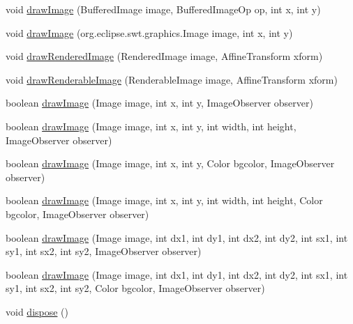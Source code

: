 \begin{DoxyCompactItemize}
\item 
void \mbox{\hyperlink{classorg_1_1jfree_1_1experimental_1_1swt_1_1_s_w_t_graphics2_d_aad9768e6f3ecfa1aabe17824271c56a4}{draw\+Image}} (Buffered\+Image image, Buffered\+Image\+Op op, int x, int y)
\item 
void \mbox{\hyperlink{classorg_1_1jfree_1_1experimental_1_1swt_1_1_s_w_t_graphics2_d_a41ea7571a02fed6f9317e03c23ddd421}{draw\+Image}} (org.\+eclipse.\+swt.\+graphics.\+Image image, int x, int y)
\item 
void \mbox{\hyperlink{classorg_1_1jfree_1_1experimental_1_1swt_1_1_s_w_t_graphics2_d_a885135c54d6453fda13876b2deccdc3c}{draw\+Rendered\+Image}} (Rendered\+Image image, Affine\+Transform xform)
\item 
void \mbox{\hyperlink{classorg_1_1jfree_1_1experimental_1_1swt_1_1_s_w_t_graphics2_d_a86f27b3270fa747ee1d2044450663e0f}{draw\+Renderable\+Image}} (Renderable\+Image image, Affine\+Transform xform)
\item 
boolean \mbox{\hyperlink{classorg_1_1jfree_1_1experimental_1_1swt_1_1_s_w_t_graphics2_d_a0baeab1618fa3f5c667c317bd5b7edc0}{draw\+Image}} (Image image, int x, int y, Image\+Observer observer)
\item 
boolean \mbox{\hyperlink{classorg_1_1jfree_1_1experimental_1_1swt_1_1_s_w_t_graphics2_d_a6410451eb0de67133fbfb0885d4a9647}{draw\+Image}} (Image image, int x, int y, int width, int height, Image\+Observer observer)
\item 
boolean \mbox{\hyperlink{classorg_1_1jfree_1_1experimental_1_1swt_1_1_s_w_t_graphics2_d_a8b1d80e13593472423d016e9793324c6}{draw\+Image}} (Image image, int x, int y, Color bgcolor, Image\+Observer observer)
\item 
boolean \mbox{\hyperlink{classorg_1_1jfree_1_1experimental_1_1swt_1_1_s_w_t_graphics2_d_a9520eb416d1975826f1cce0eca335b26}{draw\+Image}} (Image image, int x, int y, int width, int height, Color bgcolor, Image\+Observer observer)
\item 
boolean \mbox{\hyperlink{classorg_1_1jfree_1_1experimental_1_1swt_1_1_s_w_t_graphics2_d_afab63ec5938e901bca3abddbe8733bd5}{draw\+Image}} (Image image, int dx1, int dy1, int dx2, int dy2, int sx1, int sy1, int sx2, int sy2, Image\+Observer observer)
\item 
boolean \mbox{\hyperlink{classorg_1_1jfree_1_1experimental_1_1swt_1_1_s_w_t_graphics2_d_af23b00097670d1099ad7cc434b8117ee}{draw\+Image}} (Image image, int dx1, int dy1, int dx2, int dy2, int sx1, int sy1, int sx2, int sy2, Color bgcolor, Image\+Observer observer)
\item 
void \mbox{\hyperlink{classorg_1_1jfree_1_1experimental_1_1swt_1_1_s_w_t_graphics2_d_a6a2c1fa62d540523360466ecdbe1f32e}{dispose}} ()
\end{DoxyCompactItemize}


